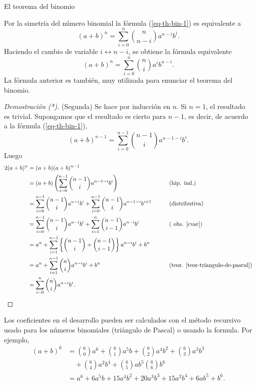 \begin{section}{El teorema del binomio}
\begin{observacion*}
    Por la simetría del número binomial la  fórmula (\ref{eq-th-bin-1}) es equivalente a 
    \begin{equation*}
    (a+b)^n= \sum_{i=0}^{n}\binom{n}{n-i} a^{n-i}b^i.
    \end{equation*}
    Haciendo  el cambio de variable $i \leftrightarrow n-i$, se obtiene la fórmula equivalente
    \begin{equation*}\label{eq-th-bin-2}
    (a+b)^n= \sum_{i=0}^{n}\binom{n}{i} a^ib^{n-i}.
    \end{equation*}
    La fórmula anterior es también, muy utilizada para enunciar el teorema del binomio.
\end{observacion*}



\begin{proof}[Demostración (*)](Segunda) Se hace por inducción en $n$. Si $n=1$, el resultado es trivial. Supongamos que el resultado es cierto para $n-1$, es decir,  de acuerdo  a la fórmula (\ref{eq-th-bin-1}),
$$
(a+b)^{n-1}=\sum_{i=0}^{n-1} \binom{n-1}{i}a ^{n-1-i}b^{i}.
$$
Luego
\begin{alignat*}2
(a+b)^n&= (a+b)(a+b)^{n-1}&& \\
& = (a+b)\left(\sum_{i=0}^{n-1} \binom{n-1}{i}a ^{n-1-i}b^{i}\right)&&\qquad \text{(hip. ind.)} \\
&=\sum_{i=0}^{n-1} \binom{n-1}{i}a ^{n-i}b^{i}+\sum_{i=0}^{n-1} \binom{n-1}{i}a ^{n-1-i}b^{i+1}&& \qquad \text{(distributiva)}\\
&=\sum_{i=0}^{n-1} \binom{n-1}{i}a ^{n-i}b^{i}+\sum_{i=1}^{n} \binom{n-1}{i-1}a ^{n-i}b^{i}&& \qquad \text{( obs. \ref{cvar})}\\
&= a^n + \sum_{i=1}^{n-1}\left\{ \binom{n-1}{i}+\binom{n-1}{i-1}\right\}a ^{n-i}b^{i}+ b^n && \qquad \text{}\\
&= a^n + \sum_{i=1}^{n-1} \binom{n}{i}a ^{n-i}b^{i}+ b^n&&\qquad \text{(teor. \ref{teor-triangulo-de-pascal})} \\
&= \sum_{i=0}^{n} \binom{n}{i}a ^{n-i}b^{i}.&&\text{}
\end{alignat*}
\end{proof}

%

Los coeficientes en el desarrollo pueden ser calculados con el método recursivo usado para los números binomiales (triángulo de Pascal) o usando la formula. Por ejemplo,
\begin{equation*}
    \begin{aligned} (a+b)^6 &= \binom{6}{0} a^6 + \binom{6}{1} a^5 b
    +\binom{6}{2}a^4b^2 +
    \binom{6}{3}a^3b^3 \\
    &\quad + \binom{6}{4}a^2b^4+\binom{6}{5}ab^5\binom{6}{6}b^6 \\
    &=  a^6 + 6 a^5 b +15a^4b^2 + 20a^3b^3 + 15a^2b^4+6ab^5+ b^6.
    \end{aligned}
\end{equation*}



\end{section}

